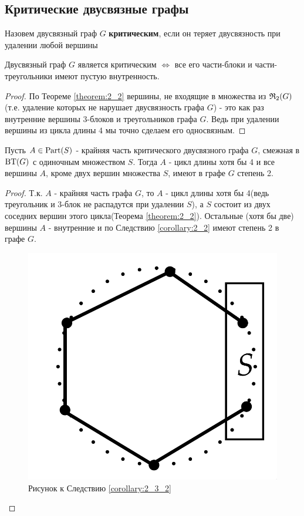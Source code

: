 \subsection{Критические двусвязные графы}

\begin{df}
	Назовем двусвязный граф  $G$ \textbf{критическим}, если он  теряет двусвязность при удалении любой вершины
\end{df}

\begin{crly}[Следствие 2.3] \label{corollary:2_3_1}
	Двусвязный граф $G$ является критическим  $\iff$ все его части-блоки и части-треугольники имеют пустую внутренность.
\end{crly}

\begin{proof}
	По Теореме \ref{theorem:2_2} вершины, не входящие в множества из $\mathfrak{R}_2(G)$(т.е. удаление которых не нарушает двусвязность графа $G$) - это как раз внутренние вершины 3-блоков и треугольников графа $G$.
	Ведь при удалении вершины из цикла длины  $4$ мы точно сделаем его односвязным. 
\end{proof}

\begin{crly}[Следствие 2.3] \label{corollary:2_3_2}
	Пусть $A \in \operatorname{Part}(S)$ - крайняя часть критического двусвязного графа $G$, смежная в $\operatorname{BT}(G)$ с одиночным множеством  $S$.
	Тогда  $A$ - цикл длины хотя бы 4 и все вершины  $A$, кроме двух вершин множества  $S$, имеют в графе  $G$ степень 2.
\end{crly}

\begin{proof}
	Т.к. $A$ - крайняя часть графа  $G$, то  $A$ - цикл длины хотя бы 4(ведь треугольник и 3-блок не распадутся при удалении $S$), а  $S$ состоит из двух соседних вершин этого цикла(Теорема \ref{theorem:2_2}).
	Остальные (хотя бы две) вершины $A$ - внутренние и по Следствию \ref{corollary:2_2} имеют степень 2 в графе  $G$.

\begin{figure}[ht]
    \centering
	\includegraphics[width=0.2\columnwidth]{figures/corollary_2_3_2.png}
    \caption{Рисунок к Следствию \ref{corollary:2_3_2}}
    \label{fig:corollary_2_3_2}
\end{figure}

\end{proof}


